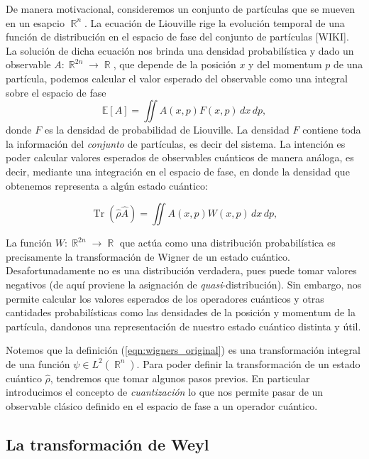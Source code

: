 \documentclass[a4paper]{report}
\DeclareMathOperator{\R}{\mathbb{R}}
\DeclareMathOperator{\Tr}{Tr}
\begin{document}
  De manera motivacional, consideremos un conjunto de
  partículas que se mueven en un esapcio $\R^{n}$. La
  ecuación de Liouville rige la evolución temporal de una
  función de distribución en el espacio de fase del conjunto
  de partículas [WIKI]. La solución de dicha ecuación nos
  brinda una densidad probabilística y dado un observable $A
  : \R^{2n} \to \R$, que depende de la posición $x$ y del
  momentum $p$ de una partícula, podemos calcular el valor
  esperado del observable como una integral sobre el espacio
  de fase
  \begin{equation}
    \mathbb E[A]
    = \iint A(x,p) F(x,p) \, dx \, dp,
  \end{equation}
  donde $F$ es la densidad de probabilidad de Liouville. La
  densidad $F$ contiene toda la información del
  \textit{conjunto} de partículas, es decir del sistema. La
  intención es poder calcular valores esperados de
  observables cuánticos de manera análoga, es decir,
  mediante una integración en el espacio de fase, en donde
  la densidad que obtenemos representa a algún estado
  cuántico:

  \begin{equation}
    \Tr\left(\hat{\rho} \hat{A}\right)
    = \iint A(x,p)W(x,p) \, dx \, dp,
  \end{equation}

  La función $W : \R^{2n} \to \R$ que actúa como una
  distribución probabilística es precisamente la
  transformación de Wigner de un estado cuántico.
  Desafortunadamente no es una distribución verdadera, pues
  puede tomar valores negativos (de aquí proviene la
  asignación de \textit{quasi}-distribución). Sin embargo,
  nos permite calcular los valores esperados de los
  operadores cuánticos y otras cantidades probabilísticas
  como las densidades de la posición y momentum de la
  partícula, dandonos una representación de nuestro estado
  cuántico distinta y útil.

  Notemos que la definición (\ref{eqn:wigners_original}) es
  una transformación integral de una función $\psi \in
  L^2(\R^{n})$. Para poder definir la transformación de un
  estado cuántico $\hat{\rho}$, tendremos que tomar algunos
  pasos previos. En particular introducimos el concepto de
  \textit{cuantización} lo que nos permite pasar de un
  observable clásico definido en el espacio de fase a un
  operador cuántico.

  \subsection{La transformación de Weyl}
\end{document}
